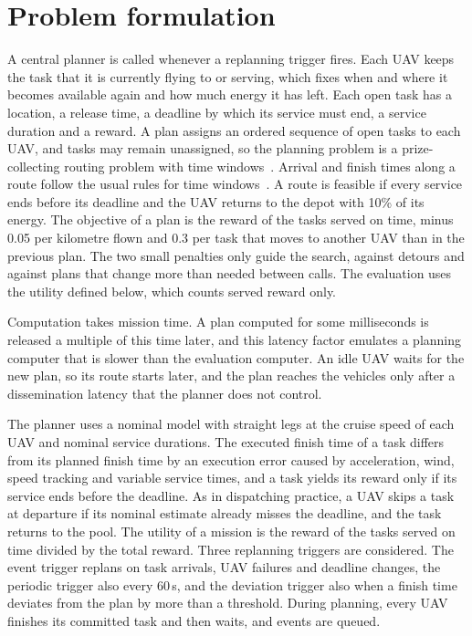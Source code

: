 \documentclass[a4paper,fleqn]{cas-dc}
\begin{document}
\section{Problem formulation}\label{sec:problem}
A central planner is called whenever a replanning trigger fires. Each UAV keeps the task that it is currently flying to
or serving, which fixes when and where it becomes available again and how much energy it has left. Each open task has a
location, a release time, a deadline by which its service must end, a service duration and a reward. A plan assigns an
ordered sequence of open tasks to each UAV, and tasks may remain unassigned, so the planning problem is a
prize-collecting routing problem with time windows~\cite{solomon1987algorithms,vansteenwegen2011orienteering}. Arrival
and finish times along a route follow the usual rules for time windows~\cite{savelsbergh1992vrptw}. A route is feasible
if every service ends before its deadline and the UAV returns to the depot with 10\% of its energy. The objective of a
plan is the reward of the tasks served on time, minus 0.05 per kilometre flown and 0.3 per task that moves to another
UAV than in the previous plan. The two small penalties only guide the search, against detours and against plans that
change more than needed between calls. The evaluation uses the utility defined below, which counts served reward only.

Computation takes mission time. A plan computed for some milliseconds is released a multiple of this time later, and
this latency factor emulates a planning computer that is slower than the evaluation computer. An idle UAV waits for the
new plan, so its route starts later, and the plan reaches the vehicles only after a dissemination latency that the
planner does not control.

The planner uses a nominal model with straight legs at the cruise speed of each UAV and nominal service durations. The
executed finish time of a task differs from its planned finish time by an execution error caused by acceleration,
wind, speed tracking and variable service times, and a task yields its reward only if its service ends before the
deadline. As in dispatching practice, a UAV skips a task at departure if its nominal estimate already misses the
deadline, and the task returns to the pool. The utility of a mission is the reward of the tasks served on time divided
by the total reward. Three replanning triggers are considered. The event trigger replans on task arrivals, UAV failures
and deadline changes, the periodic trigger also every 60\,s, and the deviation trigger also when a finish time
deviates from the plan by more than a threshold. During planning, every UAV finishes its committed task and then
waits, and events are queued.
\end{document}
